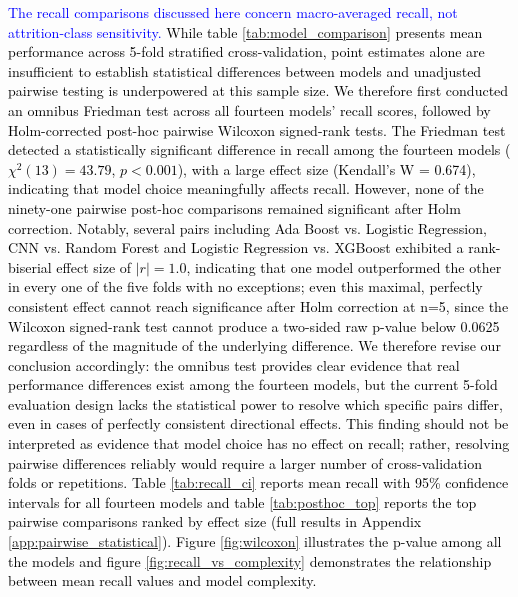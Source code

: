 \documentclass[a4paper,fleqn]{cas-sc}
\begin{document}
\textcolor{black}{\textcolor{blue}{The recall comparisons discussed here concern macro-averaged recall, not attrition-class sensitivity.} While table \ref{tab:model_comparison} presents mean performance across 5-fold stratified cross-validation, point estimates alone are insufficient to establish statistical differences between models and unadjusted pairwise testing is underpowered at this sample size. We therefore first conducted an omnibus Friedman test across all fourteen models' recall scores, followed by Holm-corrected post-hoc pairwise Wilcoxon signed-rank tests. The Friedman test detected a statistically significant difference in recall among the fourteen models ($\chi^2(13) = 43.79$, $p < 0.001$), with a large effect size (Kendall's W = 0.674), indicating that model choice meaningfully affects recall. However, none of the ninety-one pairwise post-hoc comparisons remained significant after Holm correction. Notably, several pairs including Ada Boost vs. Logistic Regression, CNN vs. Random Forest and Logistic Regression vs. XGBoost exhibited a rank-biserial effect size of $|r| = 1.0$, indicating that one model outperformed the other in every one of the five folds with no exceptions; even this maximal, perfectly consistent effect cannot reach significance after Holm correction at n=5, since the Wilcoxon signed-rank test cannot produce a two-sided raw p-value below 0.0625 regardless of the magnitude of the underlying difference. We therefore revise our conclusion accordingly: the omnibus test provides clear evidence that real performance differences exist among the fourteen models, but the current 5-fold evaluation design lacks the statistical power to resolve which specific pairs differ, even in cases of perfectly consistent directional effects. This finding should not be interpreted as evidence that model choice has no effect on recall; rather, resolving pairwise differences reliably would require a larger number of cross-validation folds or repetitions. Table \ref{tab:recall_ci} reports mean recall with 95\% confidence intervals for all fourteen models and table \ref{tab:posthoc_top} reports the top pairwise comparisons ranked by effect size (full results in Appendix \cref{app:pairwise_statistical}). Figure \ref{fig:wilcoxon} illustrates the p-value among all the models and figure \ref{fig:recall_vs_complexity} demonstrates the relationship between mean recall values and model complexity.}
\end{document}

